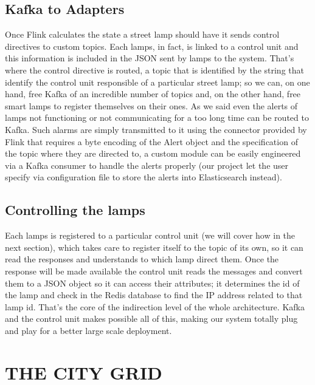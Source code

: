 \subsection{Kafka to Adapters}
Once Flink calculates the state a street lamp should have it sends control directives to custom topics. Each lamps, in fact, is linked to a control unit and this information is included in the JSON sent by lamps to the system. That’s where the control directive is routed, a topic that is identified by the string that identify the control unit responsible of a particular street lamp; so we can, on one hand, free Kafka of an incredible number of topics and, on the other hand, free smart lamps to register themselves on their ones. As we said even the alerts of lamps not functioning or not communicating for a too long time can be routed to Kafka. Such alarms are simply transmitted to it using the connector provided by Flink that requires a byte encoding of the Alert object and the specification of the topic where they are directed to, a custom module can be easily engineered via a Kafka consumer to handle the alerts properly (our project let the user specify via configuration file to store the alerts into Elasticsearch instead).

\subsection{Controlling the lamps}
Each lamps is registered to a particular control unit (we will cover how in the next section), which takes care to register itself to the topic of its own, so it can read the responses and understands to which lamp direct them. Once the response will be made available the control unit reads the messages and convert them to a JSON object so it can access their attributes; it determines the id of the lamp and check in the Redis database to find the IP address related to that lamp id. That’s the core of the indirection level of the whole architecture. Kafka and the control unit makes possible all of this, making our system totally plug and play for a better large scale deployment.


\section{THE CITY GRID}

